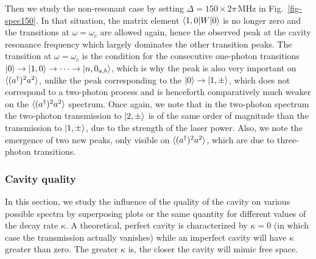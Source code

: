 Then we study the non-resonant case by setting $\Delta=150 \times 2\pi\,\mbox{MHz}$ in Fig.~\ref{fig-spec150}. In that situation, the matrix element $\langle 1,0 | W | 0 \rangle$ is no longer zero and the transitions at $\omega=\omega_c$ are allowed again, hence the observed peak at the cavity resonance frequency which largely dominates the other transition peaks. The transition at $\omega=\omega_c$ is the condition for the consecutive one-photon transitions $| 0 \rangle \rightarrow | 1,0 \rangle\rightarrow \cdots \rightarrow | n,0_{a,b} \rangle$, which is why the peak is also very important on $\langle (a^\dagger)^2 a^2 \rangle$, unlike the peak corresponding to the $| 0 \rangle \rightarrow | 1,\pm \rangle$, which does not correspond to a two-photon process and is henceforth comparatively much weaker on the $\langle (a^\dagger)^2 a^2 \rangle$ spectrum. Once again,  we note that in the two-photon spectrum the two-photon transmission to $| 2,\pm \rangle$ is of the same order of magnitude than the transmission to $| 1,\pm \rangle$, due to the strength of the laser power. Also, we note the emergence of two new peaks, only visible on $\langle (a^\dagger)^2 a^2 \rangle$, which are due to three-photon transitions.


\subsubsection{Cavity quality}

 In this section, we study the influence of the quality of the cavity on various possible spectra by superposing plots or the same quantity for different values of the decay rate $\kappa$. A theoretical, perfect cavity is characterized by $\kappa=0$ (in which case the transmission actually vanishes) while an imperfect cavity will have $\kappa$ greater than zero. The greater $\kappa$ is, the closer the cavity will mimic free space.

